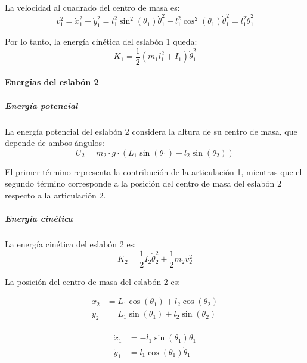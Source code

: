 La velocidad al cuadrado del centro de masa es:
\begin{equation}
v_1^2 = \dot{x}_1^2 + \dot{y}_1^2 = l_1^2\sin^2(\theta_1)\dot{\theta}_1^2 + l_1^2\cos^2(\theta_1)\dot{\theta}_1^2 = l_1^2\dot{\theta}_1^2
\end{equation}

Por lo tanto, la energía cinética del eslabón 1 queda:
\begin{equation}
K_1 = \frac{1}{2}(m_1l_1^2 + I_1)\dot{\theta}_1^2
\end{equation}

\paragraph{Energías del eslabón 2}

\subparagraph{Energía potencial}

La energía potencial del eslabón 2 considera la altura de su centro de masa, que depende de ambos ángulos:
\begin{equation}
U_2 = m_2 \cdot g \cdot (L_1 \sin(\theta_1) + l_2 \sin(\theta_2))
\end{equation}

El primer término representa la contribución de la articulación 1, mientras que el segundo término corresponde a la posición del centro de masa del eslabón 2 respecto a la articulación 2.

\subparagraph{Energía cinética}

La energía cinética del eslabón 2 es:
\begin{equation}
K_2 = \frac{1}{2} I_2 \dot{\theta}_2^2 + \frac{1}{2} m_2 v_2^2
\end{equation}

La posición del centro de masa del eslabón 2 es: \\
\noindent
\begin{minipage}{0.48\textwidth}
\begin{align}
x_2 &= L_1\cos(\theta_1) + l_2\cos(\theta_2) \\
y_2 &= L_1\sin(\theta_1) + l_2\sin(\theta_2)
\end{align}
\end{minipage}
\hfill
\begin{minipage}{0.48\textwidth}
\begin{align}
\dot{x}_1 &= -l_1 \sin(\theta_1) \dot{\theta}_1 \\
\dot{y}_1 &= l_1 \cos(\theta_1) \dot{\theta}_1
\end{align}
\end{minipage} 

